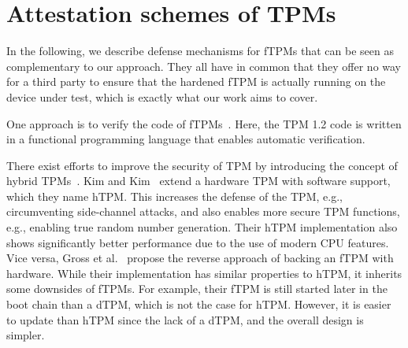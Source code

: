 
\section{Attestation schemes of TPMs}



In the following, we describe defense mechanisms for fTPMs that can be seen as complementary to our approach.
They all have in common that they offer no way for a third party to ensure that the hardened fTPM is actually running on the device under test, which is exactly what our work aims to cover.

One approach is to verify the code of fTPMs~\cite{Mukhamedov2013}.
Here, the TPM 1.2 code is written in a functional programming language that enables automatic verification.

There exist efforts to improve the security of TPM by introducing the concept of hybrid TPMs~\cite{Kim2019, Gross2021}.
Kim and Kim~\cite{Kim2019} extend a hardware TPM with software support, which they name hTPM\@.
This increases the defense of the TPM, e.g., circumventing side-channel attacks, and also enables more secure TPM functions, e.g., enabling true random number generation.
Their hTPM implementation also shows significantly better performance due to the use of modern CPU features.
Vice versa, Gross et al.~\cite{Gross2021} propose the reverse approach of backing an fTPM with hardware.
While their implementation has similar properties to hTPM, it inherits some downsides of fTPMs.
For example, their fTPM is still started later in the boot chain than a dTPM, which is not the case for hTPM\@.
However, it is easier to update than hTPM since the lack of a dTPM, and the overall design is simpler.





